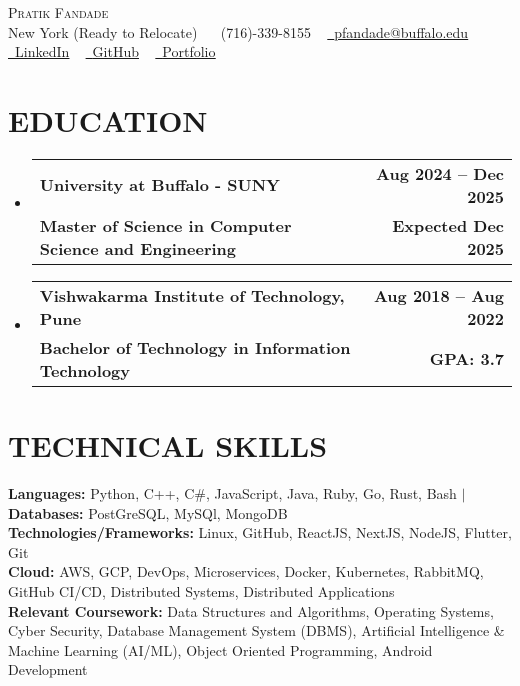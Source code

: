 \documentclass[letterpaper,10pt]{article}
\makeatletter
\newcommand{\resumeSubheading}[4]{
  \vspace{2pt}\item
    \begin{tabular*}{1.0\textwidth}[t]{l@{\extracolsep{\fill}}r}
      \textbf{\large#1} & \textbf{\normalsize #2} \\
      \textbf{\normalsize#3} & \textbf{\small #4} \\
    \end{tabular*}\vspace{-7pt}
}
\newcommand{\resumeSubHeadingListStart}{\begin{itemize}[leftmargin=0.0in, label={}]}
\newcommand{\resumeSubHeadingListEnd}{\end{itemize}}
\makeatother
\begin{document}
\begin{center}
  {\huge \scshape Pratik Fandade} \\ {New York (Ready to Relocate)} ~
  \raisebox{-0.1\height}\faPhone\ (716)-339-8155 ~
  \href{mailto:pfandade@buffalo.edu}{\raisebox{-0.2\height}\faEnvelope\ \underline{pfandade@buffalo.edu}} ~ 
  \href{https://linkedin.com/in/pratikfandade}{\raisebox{-0.2\height}\faLinkedinSquare\ \underline{LinkedIn}} ~
  \href{https://github.com/prkbuilds}{\raisebox{-0.2\height}\faGithub\ \underline{GitHub}} ~
  \href{https://pratikfandade.vercel.app/}{\raisebox{-0.2\height}\faGlobe\ \underline{Portfolio}}
\end{center}
\vspace{-10pt}
\section{EDUCATION}
\resumeSubHeadingListStart
  \resumeSubheading {University at Buffalo - SUNY}{Aug 2024 -- Dec 2025}
  {Master of Science in Computer Science and Engineering}{Expected Dec 2025}
  \resumeSubheading {Vishwakarma Institute of Technology, Pune}{Aug 2018 -- Aug 2022}
  {Bachelor of Technology in Information Technology}{GPA: 3.7}
\resumeSubHeadingListEnd
\vspace{-10pt}
\section{TECHNICAL SKILLS}
\begin{itemize}[leftmargin=0.15in, label={}]
  \small{\item{
    \textbf{\normalsize{Languages:}}{ \normalsize{Python, C++, C\#, JavaScript, Java, Ruby, Go, Rust, Bash}} $|$ \textbf{\normalsize{Databases:}}{ \normalsize{PostGreSQL, MySQl, MongoDB}} \\
    \textbf{\normalsize{Technologies/Frameworks:}}{\normalsize{ Linux, GitHub, ReactJS, NextJS, NodeJS, Flutter, Git }} \\
    \textbf{\normalsize{Cloud:}}{ \normalsize{ AWS, GCP, DevOps, Microservices, Docker, Kubernetes, RabbitMQ, GitHub CI/CD, Distributed Systems, Distributed Applications }} \\
    \textbf{\normalsize{Relevant Coursework:}}{\normalsize{ Data Structures and Algorithms, Operating Systems, Cyber Security, Database Management System (DBMS), Artificial Intelligence \& Machine Learning (AI/ML), Object Oriented Programming, Android Development }} \\
  }}
\end{itemize}
\vspace{-15pt}
\end{document}

